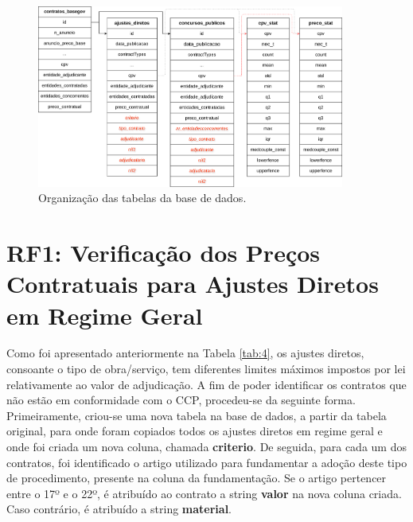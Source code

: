 \begin{figure}[H]
	\centering
	\includegraphics[width=0.9\textwidth]{imagens/basedadostabelas.png}
	\caption{Organização das tabelas da base de dados.}
	\label{fig:basededados}
\end{figure}





\section{RF1: Verificação dos Preços Contratuais para Ajustes Diretos em Regime Geral}


Como foi apresentado anteriormente na Tabela \ref{tab:4}, os ajustes diretos, consoante o tipo de obra/serviço, tem diferentes limites máximos impostos por lei relativamente ao valor de adjudicação. A fim de poder identificar os contratos que não estão em conformidade com o CCP, procedeu-se da seguinte forma. Primeiramente, criou-se uma nova tabela na base de dados, a partir da tabela original, para onde foram copiados todos os ajustes diretos em regime geral e onde foi criada um nova coluna, chamada \textbf{criterio}. De seguida, para cada um dos contratos, foi identificado o artigo utilizado para fundamentar a adoção deste tipo de procedimento, presente na coluna da fundamentação. Se o artigo pertencer entre o 17º e o 22º, é atribuído ao contrato a string \textbf{valor} na nova coluna criada. Caso contrário, é atribuído a string \textbf{material}. 

